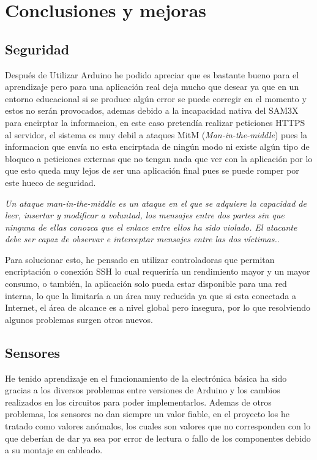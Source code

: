 
\chapter{Conclusiones y mejoras}

\section{Seguridad}

\setlength{\parindent}{5ex}Después de Utilizar Arduino he podido apreciar que es bastante bueno para el aprendizaje pero para una aplicación real deja mucho que desear ya que en un entorno educacional si se produce algún error se puede corregir en el momento y estos no serán provocados, ademas debido a la incapacidad nativa del SAM3X para encirptar la informacion, en este caso pretendía realizar peticiones HTTPS al servidor, el sistema es muy debil a ataques MitM (\textit{Man-in-the-middle}) pues la informacion que envía no esta encirptada de ningún modo ni existe algún tipo de bloqueo a peticiones externas que no tengan nada que ver con la aplicación por lo que esto queda muy lejos de ser una aplicación final pues se puede romper por este hueco de seguridad.

\setlength{\parindent}{0ex}\textit{Un ataque man-in-the-middle es un ataque en el que se adquiere la capacidad de leer, insertar y modificar a voluntad, los mensajes entre dos partes sin que ninguna de ellas conozca que el enlace entre ellos ha sido violado. El atacante debe ser capaz de observar e interceptar mensajes entre las dos víctimas.}\cite{mitm}.

Para solucionar esto, he pensado en utilizar controladoras que permitan encriptación o conexión SSH lo cual requeriría un rendimiento mayor y un mayor consumo, o también, la aplicación solo pueda estar disponible para una red interna, lo que la limitaría a un área muy reducida ya que si esta conectada a Internet, el área de alcance es a nivel global pero insegura, por lo que resolviendo algunos problemas surgen otros nuevos.

\section{Sensores}

\setlength{\parindent}{5ex}He tenido aprendizaje en el funcionamiento de la electrónica básica ha sido gracias a los diversos problemas entre versiones de Arduino y los cambios realizados en los circuitos para poder implementarlos.
\setlength{\parindent}{0ex}
Ademas de otros problemas, los sensores no dan siempre un valor fiable, en el proyecto los he tratado como valores anómalos, los cuales son valores que no corresponden con lo que deberían de dar ya sea por error de lectura o fallo de los componentes debido a su montaje en cableado.

